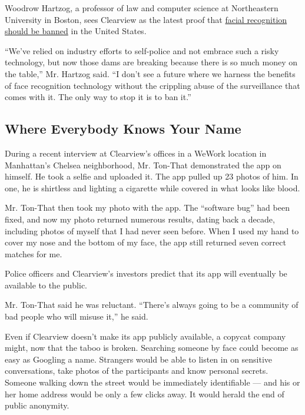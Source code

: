 Woodrow Hartzog, a professor of law and computer science at Northeastern
University in Boston, sees Clearview as the latest proof that
\href{https://www.nytimes.com/2019/10/17/opinion/facial-recognition-ban.html}{facial
recognition should be banned} in the United States.

``We've relied on industry efforts to self-police and not embrace such a
risky technology, but now those dams are breaking because there is so
much money on the table,'' Mr. Hartzog said. ``I don't see a future
where we harness the benefits of face recognition technology without the
crippling abuse of the surveillance that comes with it. The only way to
stop it is to ban it.''

\hypertarget{where-everybody-knows-your-name}{%
\subsection{Where Everybody Knows Your
Name}\label{where-everybody-knows-your-name}}

During a recent interview at Clearview's offices in a WeWork location in
Manhattan's Chelsea neighborhood, Mr. Ton-That demonstrated the app on
himself. He took a selfie and uploaded it. The app pulled up 23 photos
of him. In one, he is shirtless and lighting a cigarette while covered
in what looks like blood.

Mr. Ton-That then took my photo with the app. The ``software bug'' had
been fixed, and now my photo returned numerous results, dating back a
decade, including photos of myself that I had never seen before. When I
used my hand to cover my nose and the bottom of my face, the app still
returned seven correct matches for me.

Police officers and Clearview's investors predict that its app will
eventually be available to the public.

Mr. Ton-That said he was reluctant. ``There's always going to be a
community of bad people who will misuse it,'' he said.

Even if Clearview doesn't make its app publicly available, a copycat
company might, now that the taboo is broken. Searching someone by face
could become as easy as Googling a name. Strangers would be able to
listen in on sensitive conversations, take photos of the participants
and know personal secrets. Someone walking down the street would be
immediately identifiable --- and his or her home address would be only a
few clicks away. It would herald the end of public anonymity.


